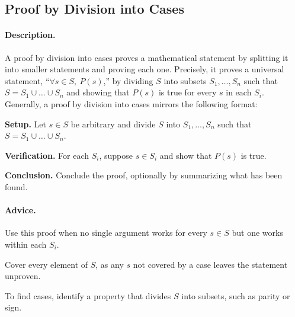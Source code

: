 \subsection{Proof by Division into Cases}
\label{subsections:techniques:universal:cases}



\paragraph{Description.}
A proof by division into cases proves a mathematical statement by splitting %
it into smaller statements and proving each one. %
Precisely, it proves a universal statement, %
``$\forall s \in S,\ P(s)$,'' %
by dividing $S$ into subsets $S_1, \dots, S_n$ such that %
$S = S_1 \cup \dots \cup S_n$ and showing that $P(s)$ is true for every %
$s$ in each $S_i$. %
Generally, a proof by division into cases mirrors the following format:
\begin{enumerate}{
    \item \textbf{Setup.} %
        Let $s \in S$ be arbitrary and divide $S$ into %
        $S_1, \dots, S_n$ such that $S = S_1 \cup \dots \cup S_n$.
    \item \textbf{Verification.} %
        For each $S_i$, suppose $s \in S_i$ and show that $P(s)$ is true.
    \item \textbf{Conclusion.} %
        Conclude the proof, optionally by summarizing what has been found.
}
\end{enumerate}



\paragraph{Advice.}
\begin{itemize}{
    \item Use this proof when no single argument works for every $s \in S$ %
        but one works within each $S_i$.
    \item Cover every element of $S$, as any $s$ not covered by a case %
        leaves the statement unproven.
    \item To find cases, identify a property that divides $S$ into %
        subsets, such as parity or sign.
}
\end{itemize}



